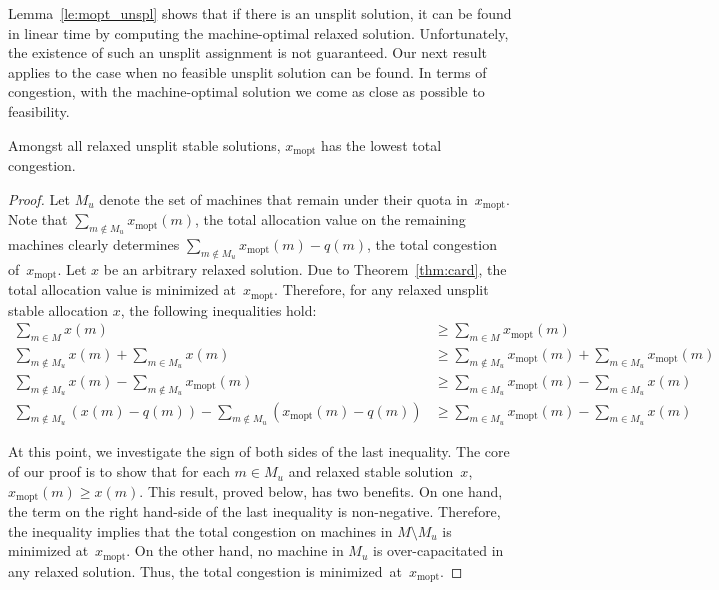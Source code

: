 \documentclass{llncs}
\begin{document}
Lemma~\ref{le:mopt_unspl} shows that if there is an unsplit solution,
it can be found in linear time by computing the machine-optimal
relaxed solution. Unfortunately, the existence of such an unsplit
assignment is not guaranteed. Our next result applies to the case when
no feasible unsplit solution can be found. In terms of congestion,
with the machine-optimal solution we come as close as possible to
feasibility.

\begin{theorem}
	Amongst all relaxed unsplit stable solutions, $x_{\text{mopt}}$ has the lowest total congestion.
\end{theorem}

\begin{proof}
	Let $M_u$ denote the set of machines that remain under their quota in~$x_{\text{mopt}}$. Note that $\sum_{m \notin M_u} {x_{\text{mopt}}(m)}$, the total allocation value on the remaining machines clearly determines $\sum_{m \notin M_u} {x_{\text{mopt}}(m) - q(m)}$, the total congestion of~$x_{\text{mopt}}$. Let $x$ be an arbitrary relaxed solution. Due to Theorem~\ref{thm:card}, the total allocation value is minimized at~$x_{\text{mopt}}$. Therefore, for any relaxed unsplit stable allocation $x$, the following inequalities hold:
	\begin{align*}
	\sum_{m \in M}{x(m)} &\geq \sum_{m \in M}{x_{\text{mopt}}(m)}\\
	\sum_{m \notin M_u} {x(m)} + \sum_{m \in M_u} {x(m)} &\geq \sum_{m \notin M_u} {x_{\text{mopt}}(m)} + \sum_{m \in M_u} {x_{\text{mopt}}(m)}\\
	\sum_{m \notin M_u} {x(m)} - \sum_{m \notin M_u} {x_{\text{mopt}}(m)}&\geq \sum_{m \in M_u} {x_{\text{mopt}}(m)} - \sum_{m \in M_u} {x(m)}\\
	\sum_{m \notin M_u} {(x(m)-q(m))} - \sum_{m \notin M_u} {(x_{\text{mopt}}(m)-q(m))}&\geq \sum_{m \in M_u} {x_{\text{mopt}}(m)} - \sum_{m \in M_u} {x(m)}\end{align*}
	
At this point, we investigate the sign of both sides of the last
inequality. The core of our proof is to show that for each $m \in M_u$
and relaxed stable solution~$x$, $x_{\text{mopt}}(m) \geq x(m)$. This
result, proved below, has two benefits. On one hand, the term
on the right hand-side of the last inequality is
non-negative. Therefore, the inequality implies that the total
congestion on machines in $M \setminus M_u$ is minimized at~$x_{\text{mopt}}$. On the other hand, no machine in $M_u$ is
over-capacitated in any relaxed solution. Thus, the total congestion
is minimized~at~$x_{\text{mopt}}$.
\end{proof}
\end{document}
